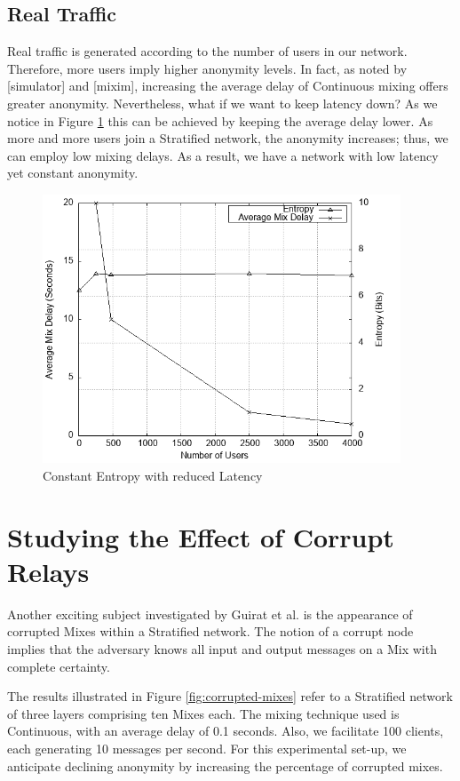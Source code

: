 \documentclass[logo,msc,cyber]{infthesis}   %
\begin{document}
\subsection{Real Traffic}

Real traffic is generated according to the number of users in our network.
Therefore, more users imply higher anonymity levels. In fact, as noted by
[simulator] and [mixim], increasing the average delay of Continuous mixing offers
greater anonymity. Nevertheless, what if we want to keep latency down? As we
notice in Figure \ref{fig:nym-stratified-low-latency-constant-anonymity} this
can be achieved by keeping the average delay lower. As more and more users join a
Stratified network, the anonymity increases; thus, we can employ low mixing
delays. As a result, we have a network with low latency yet constant anonymity.

\begin{figure}[h!]
    \centering
    \includegraphics[height=8cm]{figures/simulator/5.png}
    \caption{Constant Entropy with reduced Latency}
    \label{fig:nym-stratified-low-latency-constant-anonymity}
 \end{figure}

\section{Studying the Effect of Corrupt Relays}

Another exciting subject investigated by Guirat et al.\cite{ben2021mixim} is the
appearance of corrupted Mixes within a Stratified network. The notion of a
corrupt node implies that the adversary knows all input and output messages on a
Mix with complete certainty. 

The results illustrated in Figure \ref{fig:corrupted-mixes} refer to a
Stratified network of three layers comprising ten Mixes each. The mixing technique
used is Continuous, with an average delay of 0.1 seconds. Also, we facilitate 100
clients, each generating 10 messages per second. For this experimental set-up,
we anticipate declining anonymity by increasing the percentage of corrupted
mixes. 
\end{document}
